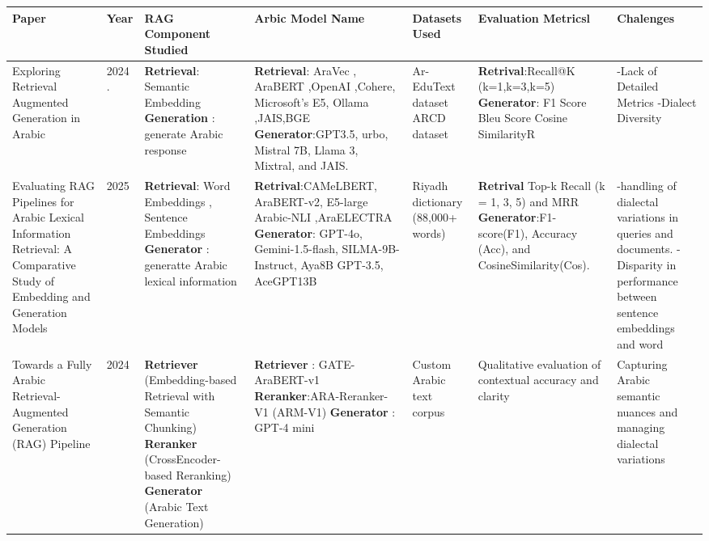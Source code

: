 \documentclass[runningheads]{llncs}
\begin{document}
\begin{table}
{\begin{tabular}{|p{3.5cm}|p{1.4cm}|p{3.5cm}|p{4.5cm}|p{3cm}|p{3.5cm}|p{3.5cm}|}
	        \textbf{Paper} & \textbf{Year} & \textbf{RAG Component Studied} & \textbf{Arbic  Model Name} & \textbf{Datasets Used} & \textbf{Evaluation Metricsl} & \textbf{Chalenges} \\
	        \hline
			Exploring Retrieval Augmented Generation in Arabic \cite{ref_elbeltagy2024} & 2024 . &  \textbf{Retrieval}: Semantic Embedding \newline \textbf{Generation} : generate Arabic response  & \textbf{Retrieval}: AraVec , AraBERT ,OpenAI ,Cohere, Microsoft’s E5,  Ollama ,JAIS,BGE \newline \textbf{Generator}:GPT3.5, urbo, Mistral 
			7B, Llama 3, Mixtral, and JAIS.
			  & Ar-EduText dataset \newline ARCD dataset 
			  &\textbf{Retrival}:Recall@K (k=1,k=3,k=5) \newline \textbf{Generator}: F1 Score Bleu Score Cosine SimilarityR&-Lack of Detailed Metrics \newline -Dialect Diversity \\
			\hline
		Evaluating RAG Pipelines for Arabic Lexical Information Retrieval: A Comparative Study of Embedding and Generation Models\cite{ref_alrasheed2025} & 2025 & \textbf{Retrieval}: Word Embeddings , Sentence Embeddings \newline \textbf{Generator} : generatte Arabic lexical information&\textbf{Retrival}:CAMeLBERT, AraBERT-v2, E5-large Arabic-NLI ,AraELECTRA  \newline \textbf{Generator}: GPT-4o, Gemini-1.5-flash, SILMA-9B-Instruct, Aya8B GPT-3.5, AceGPT13B&Riyadh dictionary (88,000+ words)&\textbf{Retrival} Top-k Recall (k = 1, 3, 5) and MRR \newline \textbf{Generator}:F1-score(F1),
		Accuracy (Acc), and CosineSimilarity(Cos). &-handling of dialectal variations in queries and documents. \newline -Disparity in performance between sentence embeddings and word \\
			\hline
		Towards a Fully Arabic Retrieval-Augmented Generation (RAG) Pipeline\cite{nacer2024} & 2024 &\textbf{Retriever} (Embedding-based Retrieval with Semantic Chunking) \newline\textbf{ Reranker} (CrossEncoder-based Reranking) \newline \textbf{Generator} (Arabic Text Generation) & \textbf{Retriever} : GATE-AraBERT-v1 \newline \textbf{ Reranker}:ARA-Reranker-V1 (ARM-V1) \newline \textbf{Generator} : GPT-4 mini &Custom Arabic text corpus& Qualitative evaluation of contextual accuracy and clarity& Capturing Arabic semantic nuances and managing dialectal variations \\ \hline
	
		\end{tabular}
	} %
\end{table}
\end{document}
